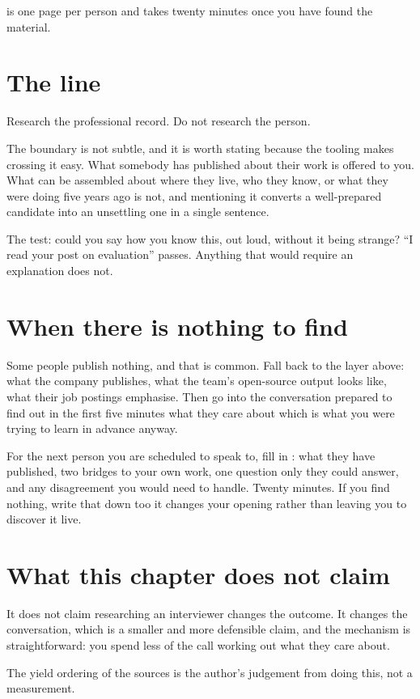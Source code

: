  is one page per person and takes twenty
minutes once you have found the material.

\section{The line}

Research the professional record. Do not research the person.

\begin{kittrap}
The boundary is not subtle, and it is worth stating because the tooling makes
crossing it easy. What somebody has published about their work is offered to
you. What can be assembled about where they live, who they know, or what they
were doing five years ago is not, and mentioning it converts a well-prepared
candidate into an unsettling one in a single sentence.

The test: could you say how you know this, out loud, without it being strange?
``I read your post on evaluation'' passes. Anything that would require an
explanation does not.
\end{kittrap}

\section{When there is nothing to find}

Some people publish nothing, and that is common. Fall back to the layer above:
what the company publishes, what the team's open-source output looks like, what
their job postings emphasise. Then go into the conversation prepared to find
out in the first five minutes what they care about \dash{} which is what you
were trying to learn in advance anyway.


\begin{drill}
For the next person you are scheduled to speak to, fill in
: what they have published, two bridges to
your own work, one question only they could answer, and any disagreement you
would need to handle. Twenty minutes. If you find nothing, write that down too
\dash{} it changes your opening rather than leaving you to discover it live.
\end{drill}

\section*{What this chapter does not claim}

It does not claim researching an interviewer changes the outcome. It changes
the conversation, which is a smaller and more defensible claim, and the
mechanism is straightforward: you spend less of the call working out what they
care about.

The yield ordering of the sources is the author's judgement from doing this,
not a measurement.
